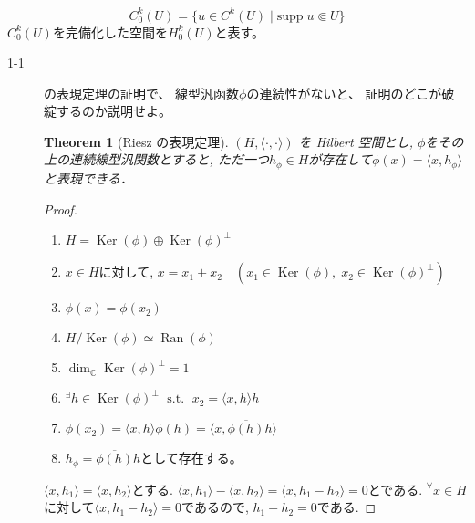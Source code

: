 \documentclass[12pt,b5paper]{ltjsarticle}
\newtheorem{theo}{Theorem}
\newcommand{\Ker}{\mathop{\mathrm{Ker}}\nolimits}
\newcommand{\Ran}{\mathop{\mathrm{Ran}}\nolimits}
\begin{document}
\begin{equation}
 C_{0}^{k}(U) = \{ u\in C^{k}(U) \mid \mathrm{supp}\; u \Subset U\}
\end{equation}
$C_{0}^{k}(U)$を完備化した空間を$H_{0}^{k}(U)$と表す。



\hrulefill


\begin{description}
 \item[1-1]
             の表現定理の証明で、
            線型汎函数$\phi$の連続性がないと、
            証明のどこが破綻するのか説明せよ。

            \begin{theo}[Riesz の表現定理]
             $(H,\langle\cdot,\cdot\rangle)$ を Hilbert 空間とし,
             $\phi$をその上の連続線型汎関数とすると,
             ただ一つ$h_{\phi}\in H$が存在して$\phi(x)=\langle x,h_{\phi}\rangle$と表現できる．
            \end{theo}

            \begin{proof}
            \begin{enumerate}
             \item $H = \Ker(\phi) \oplus \Ker(\phi)^{\perp}$
             \item $x\in H$に対して, \; $x=x_{1}+x_{2} \quad (x_{1}\in\Ker(\phi) , \; x_{2}\in\Ker(\phi)^{\perp})$
             \item $\phi(x)=\phi(x_{2})$
             \item $H/\Ker(\phi) \simeq \Ran(\phi)$
             \item $\dim_{\mathbb{C}}\Ker(\phi)^{\perp} = 1$
             \item ${}^\exists h\in\Ker(\phi)^{\perp} \; \text{ s.t. } \; x_{2}=\langle x,h \rangle h$
             \item $\phi(x_{2}) = \langle x,h \rangle \phi(h) = \langle x, \overline{\phi(h)} h \rangle$
             \item $h_{\phi} = \overline{\phi(h)} h$として存在する。
            \end{enumerate}

            $\langle x,h_{1} \rangle = \langle x,h_{2} \rangle$とする.
            $\langle x,h_{1} \rangle - \langle x,h_{2} \rangle = \langle x,h_{1} - h_{2} \rangle=0$とである.
            ${}^\forall x \in H$に対して$\langle x,h_{1} - h_{2} \rangle=0$であるので,
            $h_{1}-h_{2}=0$である.
            \end{proof}


\end{description}
\end{document}
